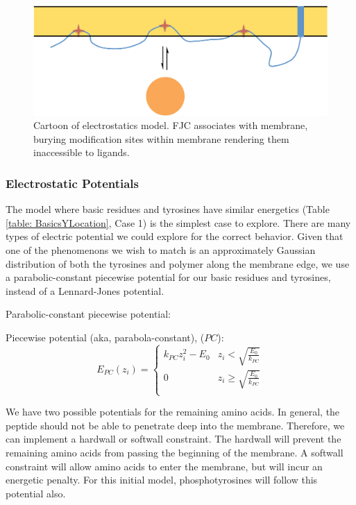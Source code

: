 \documentclass[../../AdvancementSummary.tex]{subfiles}
\begin{document}
\begin{figure}[H]
\begin{center}
    \includegraphics[width=0.7\linewidth]{ElectrostaticsDiagram.pdf}
    \caption{Cartoon of electrostatics model. FJC associates with membrane, burying modification sites within membrane rendering them inaccessible to ligands.\label{fig: ElectrostaticsCartoon}}
    \end{center}
\end{figure}


\subsubsection{Electrostatic Potentials}

The model where basic residues and tyrosines have similar energetics (Table \ref{table: BasicsYLocation}, Case 1) is the simplest case to explore. There are many types of electric potential we could explore for the correct behavior. Given that one of the phenomenons we wish to match is an approximately Gaussian distribution of both the tyrosines and polymer along the membrane edge, we use a parabolic-constant piecewise potential for our basic residues and tyrosines, instead of a Lennard-Jones potential. 

Parabolic-constant piecewise potential:

Piecewise potential (aka, parabola-constant), ($PC$):
\begin{equation}\label{eq: parabolaconstant}
E_{PC}(z_i) = 
\begin{cases}
k_{PC}z_i^2-E_0 	& z_i<\sqrt{\frac{E_0}{k_{PC}}}\\
0 & z_i \geq \sqrt{\frac{E_0}{k_{PC}}} \\
\end{cases}
\end{equation}

We have two possible potentials for the remaining amino acids. In general, the peptide should not be able to penetrate deep into the membrane. Therefore, we can implement a hardwall or softwall constraint. The hardwall will prevent the remaining amino acids from passing the beginning of the membrane. A softwall constraint will allow amino acids to enter the membrane, but will incur an energetic penalty. For this initial model, phosphotyrosines will follow this potential also.
\end{document}
